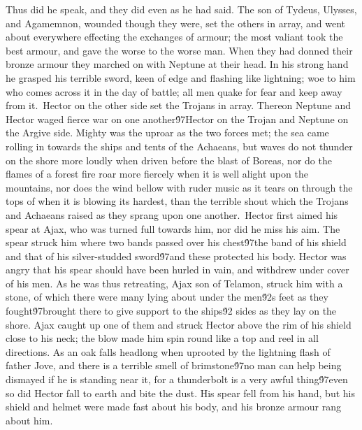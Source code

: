 {Thus did he speak, and they did even as he had said. The son of Tydeus, Ulysses, and Agamemnon, wounded though they were, set the others in array, and went about everywhere effecting the exchanges of armour; the most valiant took the best armour, and gave the worse to the worse man. When they had donned their bronze armour they marched on with Neptune at their head. In his strong hand he grasped his terrible sword, keen of edge and flashing like lightning; woe to him who comes across it in the day of battle; all men quake for fear and keep away from it.\
Hector on the other side set the Trojans in array. Thereon Neptune and Hector waged fierce war on one another\'97Hector on the Trojan and Neptune on the Argive side. Mighty was the uproar as the two forces met; the sea came rolling in towards the ships and tents of the Achaeans, but waves do not thunder on the shore more loudly when driven before the blast of Boreas, nor do the flames of a forest fire roar more fiercely when it is well alight upon the mountains, nor does the wind bellow with ruder music as it tears on through the tops of when it is blowing its hardest, than the terrible shout which the Trojans and Achaeans raised as they sprang upon one another.\
Hector first aimed his spear at Ajax, who was turned full towards him, nor did he miss his aim. The spear struck him where two bands passed over his chest\'97the band of his shield and that of his silver-studded sword\'97and these protected his body. Hector was angry that his spear should have been hurled in vain, and withdrew under cover of his men. As he was thus retreating, Ajax son of Telamon, struck him with a stone, of which there were many lying about under the men\'92s feet as they fought\'97brought there to give support to the ships\'92 sides as they lay on the shore. Ajax caught up one of them and struck Hector above the rim of his shield close to his neck; the blow made him spin round like a top and reel in all directions. As an oak falls headlong when uprooted by the lightning flash of father Jove, and there is a terrible smell of brimstone\'97no man can help being dismayed if he is standing near it, for a thunderbolt is a very awful thing\'97even so did Hector fall to earth and bite the dust. His spear fell from his hand, but his shield and helmet were made fast about his body, and his bronze armour rang about him.\
}
